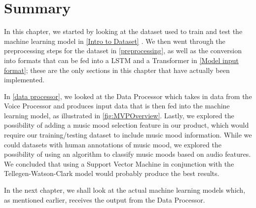 \section{Summary}

In this chapter, we started by looking at the dataset used to train and test the machine learning model in \cref{Intro to Dataset} . We then went through the preprocessing steps for the dataset in \cref{preprocessing}, as well as the conversion into formats that can be fed into a LSTM and a Transformer in \cref{Model input format}; these are the only sections in this chapter that have actually been implemented. 

In \cref{data processor}, we looked at the Data Processor which takes in data from the Voice Processor and produces input data that is then fed into the machine learning model, as illustrated in \cref{fig:MVPOverview}. Lastly, we explored the possibility of adding a music mood selection feature in our product, which would require our training/testing dataset to include music mood information. While we could datasets with human annotations of music mood, we explored the possibility of using an algorithm to classify music moods based on audio features. We concluded that using a Support Vector Machine in conjunction with the Tellegen-Watson-Clark model would probably produce the best results.

In the next chapter, we shall look at the actual machine learning models which, as mentioned earlier, receives the output from the Data Processor.